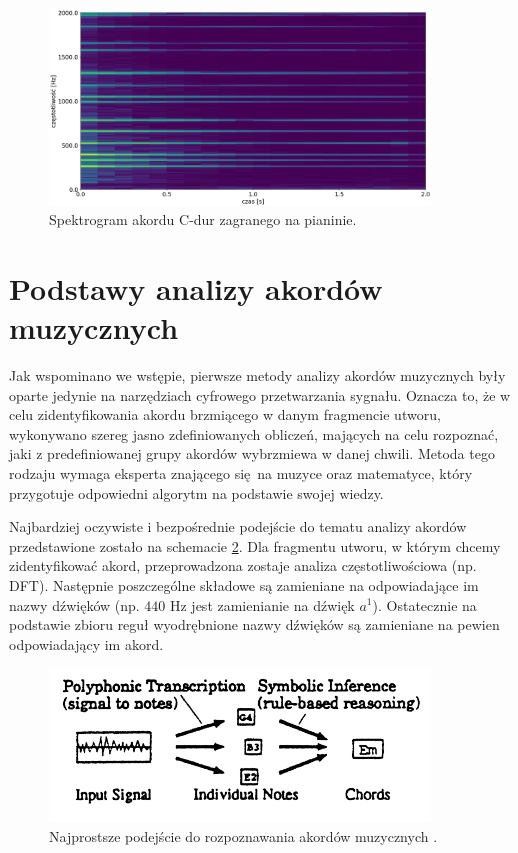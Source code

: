 \begin{figure}[htb]
    \centering
    \includegraphics[width=0.9\textwidth]{images/spektrogram_cdur}
    \caption{Spektrogram akordu C-dur zagranego na pianinie.}
    \label{fig:spektrogram_cdur}
\end{figure}



\section{Podstawy analizy akordów muzycznych}

Jak wspominano we wstępie, pierwsze metody analizy akordów muzycznych były oparte jedynie na narzędziach cyfrowego przetwarzania sygnału. Oznacza to, że w celu zidentyfikowania akordu brzmiącego w danym fragmencie utworu, wykonywano szereg jasno zdefiniowanych obliczeń, mających na celu rozpoznać, jaki z predefiniowanej grupy akordów wybrzmiewa w danej chwili. Metoda tego rodzaju wymaga eksperta znającego się na muzyce oraz matematyce, który przygotuje odpowiedni algorytm na podstawie swojej wiedzy.

Najbardziej oczywiste i bezpośrednie podejście do tematu analizy akordów przedstawione zostało na schemacie \ref{fig:rozpoznawanie_stare_1}. Dla fragmentu utworu, w którym chcemy zidentyfikować akord, przeprowadzona zostaje analiza częstotliwościowa (np. DFT). Następnie poszczególne składowe są zamieniane na odpowiadające im nazwy dźwięków (np. $440$ Hz jest zamienianie na dźwięk $a^1$). Ostatecznie na podstawie zbioru reguł wyodrębnione nazwy dźwięków są zamieniane na pewien odpowiadający im akord.

\begin{figure}[htb]
    \centering
    \includegraphics[width=0.9\textwidth]{images/rozpoznawanie_stare_1}
    \caption{Najprostsze podejście do rozpoznawania akordów muzycznych \cite{fujishima_realtime_1999}.}
    \label{fig:rozpoznawanie_stare_1}
\end{figure}

